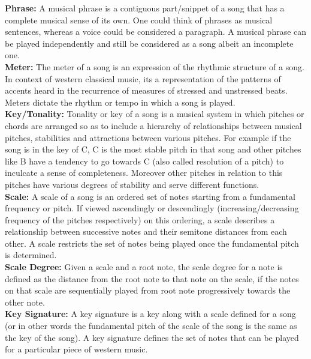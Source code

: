 \noindent \textbf{Phrase:} A musical phrase is a contiguous part/snippet of a song that has a complete musical sense of its own. One could think of phrases as musical sentences, whereas a voice could be considered a paragraph. A musical phrase can be played independently and still be considered as a song albeit an incomplete one. \\

\noindent \textbf{Meter:} The meter of a song is an expression of the rhythmic structure of a song. In context of western classical music, its a representation of the patterns of accents heard in the recurrence of measures of stressed and unstressed beats. Meters dictate the rhythm or tempo in which a song is played. \\

\noindent \textbf{Key/Tonality:} Tonality or key of a song is a musical system in which pitches or chords are arranged so as to include a hierarchy of relationships between musical pitches, stabilities and attractions between various pitches. For example if the song is in the key of C, C is the most stable pitch in that song and other pitches like B have a tendency to go towards C (also called resolution of a pitch) to inculcate a sense of completeness. Moreover other pitches in relation to this pitches have various degrees of stability and serve different functions. \\

\noindent \textbf{Scale:} A scale of a song is an ordered set of notes starting from a fundamental frequency or pitch. If viewed ascendingly or descendingly (increasing/decreasing frequency of the pitches respectively) on this ordering, a scale describes a relationship between successive notes and their semitone distances from each other. A scale restricts the set of notes being played once the fundamental pitch is determined. \\

\noindent \textbf{Scale Degree:} Given a scale and a root note, the scale degree for a note is defined as the distance from the root note to that note on the scale, if the notes on that scale are sequentially played from root note progressively towards the other note. \\

\noindent \textbf{Key Signature:} A key signature is a key along with a scale defined for a song (or in other words the fundamental pitch of the scale of the song is the same as the key of the song). A key signature defines the set of notes that can be played for a particular piece of western music. \\

